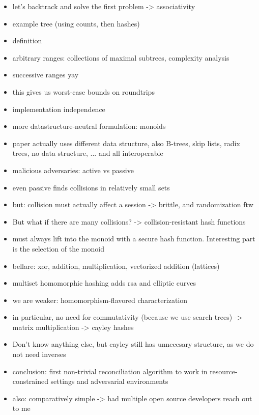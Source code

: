 \begin{frame}{}
\begin{itemize}
    \item let's backtrack and solve the first problem -> associativity
    \item example tree (using counts, then hashes)
    \item definition
    \item arbitrary ranges: collections of maximal subtrees, complexity analysis
    \item successive ranges yay
\end{itemize}

\begin{itemize}
    \item this gives us worst-case bounds on roundtrips
    \item implementation independence
    \item more datastructure-neutral formulation: monoids
    \item paper actually uses different data structure, also B-trees, skip lists, radix trees, no data structure, ... and all interoperable
\end{itemize}

\begin{itemize}
    \item malicious adversaries: active vs passive
    \item even passive finds collisions in relatively small sets
    \item but: collision must actually affect a session -> brittle, and randomization ftw
    \item But what if there are many collisions? -> collision-resistant hash functions
\end{itemize}

\begin{itemize}
    \item must always lift into the monoid with a secure hash function. Interesting part is the selection of the monoid
    \item bellare: xor, addition, multiplication, vectorized addition (lattices)
    \item multiset homomorphic hashing adds rsa and elliptic curves
    \item we are weaker: homomorphism-flavored characterization
    \item in particular, no need for commutativity (because we use search trees) -> matrix multiplication -> cayley hashes
    \item Don't know anything else, but cayley still has unnecesary structure, as we do not need inverses
\end{itemize}

\begin{itemize}
    \item conclusion: first non-trivial reconciliation algorithm to work in resource-constrained settings and adversarial environments
    \item also: comparatively simple -> had multiple open source developers reach out to me
\end{itemize}
\end{frame}


